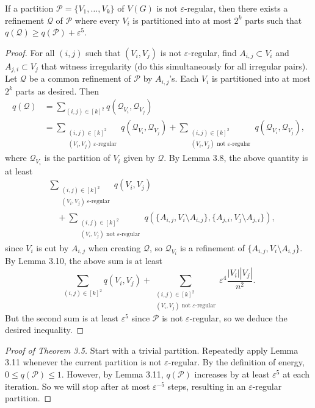 \begin{lemma}[3.11]
If a partition $\mathcal P=\{V_1,\ldots,V_k\}$ of $V(G)$ is not $\varepsilon$-regular, then there exists a refinement $\mathcal Q$ of $\mathcal P$ where every $V_i$ is partitioned into at most $2^k$ parts such that $q(\mathcal Q)\geq q(\mathcal P)+\varepsilon^5$.
\end{lemma}
\begin{proof}
For all $(i,j)$ such that $(V_i,V_j)$ is not $\varepsilon$-regular, find $A_{i,j}\subset V_i$ and $A_{j,i}\subset V_j$ that witness irregularity (do this simultaneously for all irregular pairs). Let $\mathcal Q$ be a common refinement of $\mathcal P$ by $A_{i,j}$'s. Each $V_i$ is partitioned into at most $2^k$ parts as desired. Then
\[\begin{split}
q(\mathcal Q)&=\sum_{(i,j)\in[k]^2}q(\mathcal Q_{V_i},\mathcal Q_{V_j})\\
&=\sum_{\substack{(i,j)\in[k]^2\\(V_i,V_j)\ \varepsilon\text{-regular}}}q(\mathcal Q_{V_i},\mathcal Q_{V_j})
+\sum_{\substack{(i,j)\in[k]^2\\(V_i,V_j)\text{ not }\varepsilon\text{-regular}}}q(\mathcal Q_{V_i},\mathcal Q_{V_j}),
\end{split}\]
where $\mathcal Q_{V_i}$ is the partition of $V_i$ given by $\mathcal Q$. By Lemma 3.8, the above quantity is at least
\[\begin{split}
&\sum_{\substack{(i,j)\in[k]^2\\(V_i,V_j)\ \varepsilon\text{-regular}}}q(V_i,V_j)\\
&\quad+\sum_{\substack{(i,j)\in[k]^2\\(V_i,V_j)\text{ not }\varepsilon\text{-regular}}}
q(\{A_{i,j},V_i\setminus A_{i,j}\},\{A_{j,i},V_j\setminus A_{j,i}\}),
\end{split}\]
since $V_i$ is cut by $A_{i,j}$ when creating $\mathcal Q$, so $\mathcal Q_{V_i}$ is a refinement of $\{A_{i,j},V_i\setminus A_{i,j}\}$. By Lemma 3.10, the above sum is at least
\[\sum_{(i,j)\in[k]^2}q(V_i,V_j)+\sum_{\substack{(i,j)\in[k]^2\\(V_i,V_j)\text{ not }\varepsilon\text{-regular}}}\varepsilon^4\frac{|V_i||V_j|}{n^2}.\]
But the second sum is at least $\varepsilon^5$ since $\mathcal P$ is not $\varepsilon$-regular, so we deduce the desired inequality.
\end{proof}
\begin{proof}[Proof of Theorem 3.5]
Start with a trivial partition. Repeatedly apply Lemma 3.11 whenever the current partition is not $\varepsilon$-regular. By the definition of energy, $0\leq q(\mathcal P)\leq1$. However, by Lemma 3.11, $q(\mathcal P)$ increases by at least $\varepsilon^5$ at each iteration. So we will stop after at most $\varepsilon^{-5}$ steps, resulting in an $\varepsilon$-regular partition.
\end{proof}

